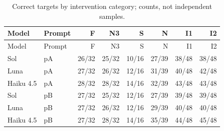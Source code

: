 \documentclass[11pt,a4paper]{article}
\begin{document}
\begingroup\small\setlength{\tabcolsep}{4pt}
\begin{longtable}{llrrrrrr}
\caption{Correct targets by intervention category; counts, not independent samples.}\\
\toprule
Model & Prompt & F & N3 & S & N & I1 & I2 \\
\midrule\endfirsthead
\toprule
Model & Prompt & F & N3 & S & N & I1 & I2 \\
\midrule\endhead
\bottomrule\endfoot
Sol & pA & 26/32 & 25/32 & 10/16 & 27/39 & 38/48 & 38/48 \\
Luna & pA & 27/32 & 26/32 & 12/16 & 31/39 & 40/48 & 42/48 \\
Haiku 4.5 & pA & 28/32 & 28/32 & 14/16 & 32/39 & 43/48 & 43/48 \\
Sol & pB & 27/32 & 25/32 & 12/16 & 27/39 & 39/48 & 39/48 \\
Luna & pB & 27/32 & 26/32 & 12/16 & 29/39 & 40/48 & 40/48 \\
Haiku 4.5 & pB & 27/32 & 28/32 & 14/16 & 35/39 & 44/48 & 45/48 \\
\end{longtable}\endgroup
\end{document}
